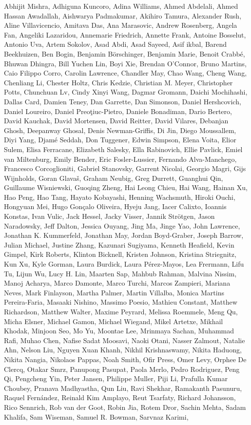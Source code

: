     
    \begin{addmargin}[0.2in]{0em}
Abhijit Mishra, Adhiguna Kuncoro, Adina Williams, Ahmed Abdelali, Ahmed Hassan Awadallah, Aishwarya Padmakumar, Akihiro Tamura, Alexander Rush, Aline Villavicencio, Amitava Das, Ana Marasovic, Andrew Rosenberg, Angela Fan, Angeliki Lazaridou, Annemarie Friedrich, Annette Frank, Antoine Bosselut, Antonio Uva, Artem Soko\-lov, Asad Abdi, Asad Sayeed, Asif ikbal, Barend Beekhuizen, Ben Bogin, Benjamin Bör\-schinger, Benjamin Marie, Benoit Crabbé, Bhuwan Dhingra, Bill Yuchen Lin, Boyi Xie, Brendan O'Connor, Bruno Martins, Caio Filippo Corro, Carolin Lawrence, Chandler May, Chao Wang, Cheng Wang, Chenliang Li, Chester Holtz, Chris Kedzie, Christian M. Meyer, Christopher Potts, Chunchuan Lv, Cindy Xinyi Wang, Dagmar Gromann, Daichi Mochihashi, Dallas Card, Damien Teney, Dan Garrette, Dan Simonson, Daniel Hershcovich, Daniel Loureiro, Daniel Preoţiuc-Pietro, Daniele Bonadiman, Dario Bertero, David Kauchak, David Mortensen, David Reitter, David Vilares, Debanjan Ghosh, Deepanway Ghosal, Denis Newman-Griffis, Di Jin, Diego Moussallem, Diyi Yang, Djamé Seddah, Don Tuggener, Edwin Simpson, Elena Voita, Elior Sulem, Elisa Ferracane, Elizabeth Salesky, Ella Rabinovich, Ellie Pavlick, Emiel van Miltenburg, Emily Bender, Eric Fosler-Lussier, Fernando Alva-Manchego, Francesco Corcoglioniti, Gabriel Stanovsky, Garrent Nicolai, Georgio Magri, Gijs Wijnholds, Goran Glavaš, Graham Neubig, Greg Durrett, Guanghui Qin, Guillaume Wisniewski, Guoqing Zheng, Hai Leong Chieu, Hai Wang, Hainan Xu, Hao Peng, Hao Tang, Hayato Kobayashi, Henning Wachsmuth, Hiroki Ouchi, Hongyuan Mei, Hugo Gonçalo Oliveira, Hyeju Jang, Iacer Calixto, Ioannis Konstas, Ivan Vulic, Jack Hessel, Jacky Visser, Jannik Strötgen, Jason Naradowsky, Jeff Dalton, Jessica Ouyang, Jing Ma, Jinge Yao, John Lawrence, Jonathan K. Kummerfeld, Jonathan May, Jordan Boyd-Graber, Joseph Barrow, Julian Michael, Justine Zhang, Kazunari Sugiyama, Kenneth Heafield, Kevin Gimpel, Kirk Roberts, Klinton Bicknell, Kristen Johnson, Kristina Striegnitz, Kun Xu, Kyle Gorman, Laura Burdick, Laura Pérez-Mayos, Lea Frermann, Lifu Tu, Lijun Wu, Lucy H. Lin, Maarten Sap, Mahbub Rahman, Malvina Nissim, Manoj Acharya, Marco Damonte, Marco Turchi, Marcos Zampieri, Mariana Neves, Mark Finlayson, Martha Palmer, Martin Villalba, Monica Martins Pereira-Faria, Masaaki Nishino, Massimo Poesio, Mathieu Constant, Matthew Richardson, Matthew Walter, Maxime Peyrard, Melissa Roemmele, Meng Qu, Micha Elsner, Michael Gamon, Michael Wiegand, Mikel Artetxe, Mikhail Khodak, Minjoon Seo, Mo Yu, Moontae Lee, Mrinmaya Sachan, Muhammad Rafi, Muhao Chen, Nafise Sadat Moosavi, Naoki Otani, Nasser Zalmout, Natalie Ahn, Nelson Liu, Nguyen Xuan Khanh, Nikhil Krishnaswamy, Nikita Haduong, Nikita Nangia, Nikolaos Pappas, Noah Smith, Ofir Press, Omer Levy, Orphee De Clercq, Otakar Smrz, Panupong Pasupat, Paola Merlo, Pedro Rodriguez, Peng Qi, Pengcheng Yin, Peter Jansen, Philippe Muller, Piji Li, Prafulla Kumar Choubey, Pranava Madhyastha, Qun Liu, Ravi Shekhar, Ramakanth Pasunuru, Raquel Fernández, Reinald Kim Amplayo, Reut Tsarfaty, Richard Johansson, Rico Sennrich, Rob van der Goot, Robin Jia, Rotem Dror, Sachin Mehta, Sadam Khalifa, Sam Wiseman, Samuel R. Bowman, Sarvnaz Karimi, 
\end{addmargin}
